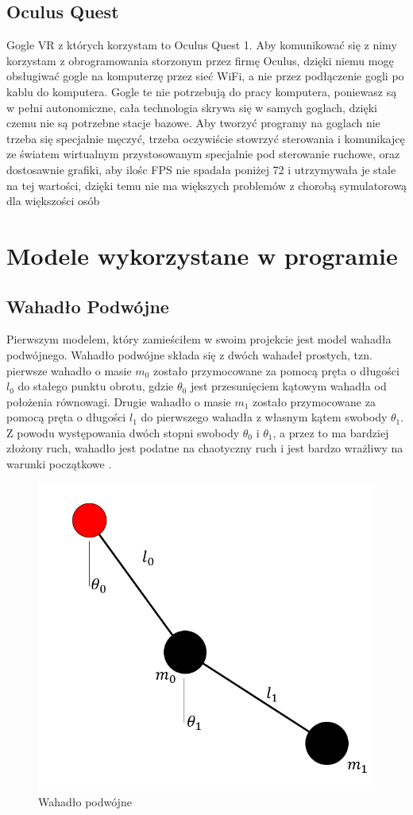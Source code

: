 \documentclass[a4paper,12pt,reqno]{article}
\begin{document}
\subsection{Oculus Quest}

{\color{red}
 Gogle VR z których korzystam to Oculus Quest 1. Aby komunikować się z nimy korzystam z obrogramowania storzonym przez firmę Oculus, dzięki niemu mogę obsługiwać gogle na komputerzę przez sieć WiFi, a nie przez podłączenie gogli po kablu do komputera. Gogle te nie potrzebują do pracy komputera, poniewasz są w pełni autonomiczne, cała technologia skrywa się w samych goglach, dzięki czemu nie są potrzebne stacje bazowe. Aby tworzyć programy na goglach nie trzeba się specjalnie męczyć, trzeba oczywiście stowrzyć sterowania i komunikajcę ze światem wirtualnym przystosowanym specjalnie pod sterowanie ruchowe, oraz dostosawnie grafiki, aby ilośc FPS nie spadała poniżej 72 i utrzymywała je stale na tej wartości, dzięki temu nie ma większych problemów z chorobą symulatorową dla większości osób
}

\section{Modele wykorzystane w programie}

\subsection{Wahadło Podwójne}

Pierwszym modelem, który zamieściłem w swoim projekcie jest model wahadła podwójnego. Wahadło podwójne składa się z dwóch wahadeł prostych, tzn. pierwsze wahadło o masie $m_0$ zostało przymocowane za pomocą pręta o długości $l_0$ do stałego punktu obrotu, gdzie $\theta_0$ jest przesunięciem kątowym wahadła od położenia równowagi. Drugie wahadło o masie $m_1$ zostało przymocowane za pomocą pręta o długości $l_1$ do pierwszego wahadła z własnym kątem swobody $\theta_1$. Z powodu występowania dwóch stopni swobody $\theta_0$ i $\theta_1$, a przez to ma bardziej złożony ruch, wahadło jest podatne na chaotyczny ruch i jest bardzo wrażliwy na warunki początkowe \cite{double_pendulum_book}.

\begin{figure}[H]%
\centering
\includegraphics[width=0.5\columnwidth]{graphics/pendulum/DoublePendulum.png}
\caption{Wahadło podwójne
\label{BPExample}}%
%
\qquad
\end{figure}  
\end{document}
